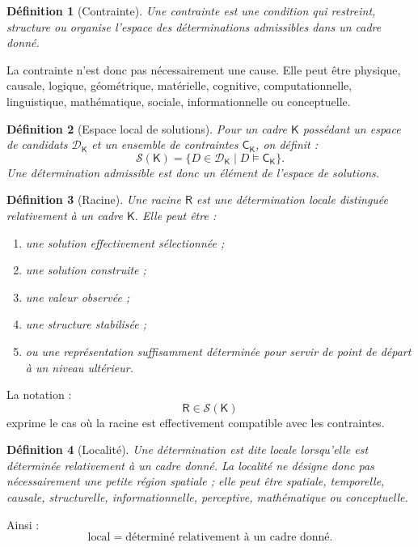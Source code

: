 \documentclass[11pt,a4paper]{article}
\newtheorem{definition}{Définition}[section]
\newcommand{\Rac}{\mathsf{R}}
\newcommand{\Cadre}{\mathsf{K}}
\newcommand{\Con}{\mathsf{C}}
\newcommand{\Sol}{\mathcal{S}}
\newcommand{\sat}{\models}
\begin{document}
\begin{definition}[Contrainte]
Une \emph{contrainte} est une condition qui restreint, structure ou organise
l'espace des déterminations admissibles dans un cadre donné.
\end{definition}

La contrainte n'est donc pas nécessairement une cause. Elle peut être physique,
causale, logique, géométrique, matérielle, cognitive, computationnelle,
linguistique, mathématique, sociale, informationnelle ou conceptuelle.

\begin{definition}[Espace local de solutions]
Pour un cadre \(\Cadre\) possédant un espace de candidats \(\mathcal D_{\Cadre}\)
et un ensemble de contraintes \(\Con_{\Cadre}\), on définit :
\[
\Sol(\Cadre)=
\{D\in\mathcal D_{\Cadre}\mid D\sat\Con_{\Cadre}\}.
\]
Une détermination admissible est donc un élément de l'espace de solutions.
\end{definition}

\begin{definition}[Racine]
Une \emph{racine} \(\Rac\) est une détermination locale distinguée relativement
à un cadre \(\Cadre\). Elle peut être :
\begin{enumerate}
    \item une solution effectivement sélectionnée ;
    \item une solution construite ;
    \item une valeur observée ;
    \item une structure stabilisée ;
    \item ou une représentation suffisamment déterminée pour servir de point
de départ à un niveau ultérieur.
\end{enumerate}
\end{definition}

La notation :
\[
\boxed{\Rac\in\Sol(\Cadre)}
\]
exprime le cas où la racine est effectivement compatible avec les contraintes.

\begin{definition}[Localité]
Une détermination est dite \emph{locale} lorsqu'elle est déterminée relativement
à un cadre donné. La localité ne désigne donc pas nécessairement une petite
région spatiale ; elle peut être spatiale, temporelle, causale, structurelle,
informationnelle, perceptive, mathématique ou conceptuelle.
\end{definition}

Ainsi :
\[
\boxed{
\text{local}=\text{déterminé relativement à un cadre donné}.
}
\]
\end{document}
